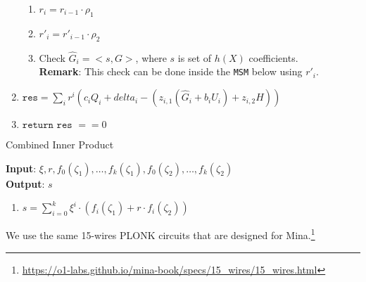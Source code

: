 \begin{algorithm}[H]
\begin{enumerate}
\begin{enumerate}
            \item $r_i = r_{i - 1} \cdot \rho_1$
            \item $r'_i = r'_{i - 1} \cdot \rho_2$
            \item Check $\hat{G}_i = <s, G>$, where $s$ is set of $h(X)$ coefficients. \\
            \textbf{Remark}: This check can be done inside the \texttt{MSM} below using $r'_i$.
        \end{enumerate}
        \item $\texttt{res} = \sum\limits_i r^i (c_i Q_i + delta_i - ( z_{i, 1} (\hat{G}_i + b_i U_i) + z_{i, 2} H ))$
        \item $\texttt{return res } == 0$
    \end{enumerate}
\end{algorithm}

\begin{algorithm}[H]
    \caption{Combined Inner Product}
    \textbf{Input}: $\xi, r, f_0(\zeta_1), \dots, f_k(\zeta_1), f_0(\zeta_2), \dots, f_k(\zeta_2)$ \\ %
    \textbf{Output}: $s$
    \begin{enumerate}
        \item $s = \sum\limits_{i = 0}^{k} \xi^i \cdot (f_i(\zeta_1) + r \cdot f_i(\zeta_2))$
    \end{enumerate}
\end{algorithm}
We use the same 15-wires PLONK circuits that are designed for Mina.\footnote{\url{https://o1-labs.github.io/mina-book/specs/15_wires/15_wires.html}}
